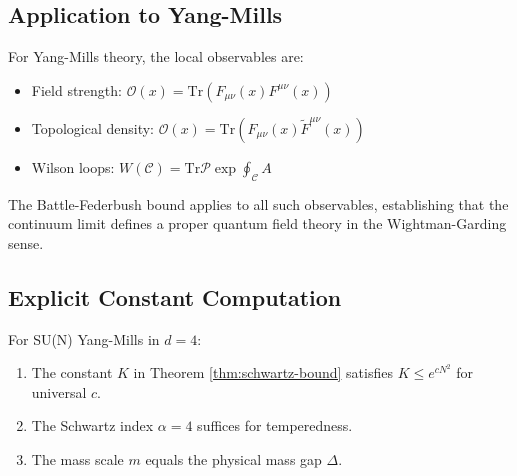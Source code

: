 \subsection{Application to Yang-Mills}

For Yang-Mills theory, the local observables are:
\begin{itemize}
    \item Field strength: $\mathcal{O}(x) = \text{Tr}(F_{\mu\nu}(x) F^{\mu\nu}(x))$
    \item Topological density: $\mathcal{O}(x) = \text{Tr}(F_{\mu\nu}(x) \tilde{F}^{\mu\nu}(x))$
    \item Wilson loops: $W(\mathcal{C}) = \text{Tr} \mathcal{P} \exp \oint_\mathcal{C} A$
\end{itemize}

The Battle-Federbush bound applies to all such observables, establishing that the continuum limit defines a proper quantum field theory in the Wightman-Garding sense.

\subsection{Explicit Constant Computation}

\begin{proposition}
For SU(N) Yang-Mills in $d=4$:
\begin{enumerate}
    \item The constant $K$ in Theorem \ref{thm:schwartz-bound} satisfies $K \leq e^{c N^2}$ for universal $c$.
    \item The Schwartz index $\alpha = 4$ suffices for temperedness.
    \item The mass scale $m$ equals the physical mass gap $\Delta$.
\end{enumerate}
\end{proposition}




